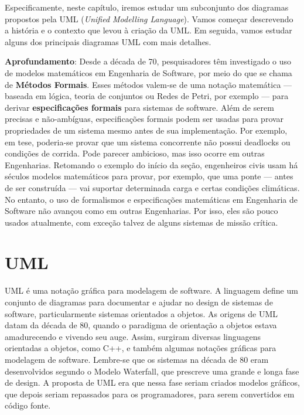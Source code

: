 \documentclass[
  11pt,
  twoside]{book}
\newenvironment{esmbox}{\centering \vspace{1.5ex} \begin{tcolorbox}[breakable, colback=backcolor, width=4.9in]}{\end{tcolorbox} \vspace{1.5ex}}
\begin{document}
Especificamente, neste capítulo, iremos estudar um subconjunto dos
diagramas propostos pela UML (\emph{Unified Modelling Language}). Vamos
começar descrevendo a história e o contexto que levou à criação da UML.
Em seguida, vamos estudar alguns dos principais diagramas UML com mais
detalhes.


\begin{esmbox}

\textbf{Aprofundamento}: Desde a década de 70, pesquisadores têm
investigado o uso de modelos matemáticos em Engenharia de Software, por
meio do que se chama de \textbf{Métodos Formais}. Esses métodos valem-se
de uma notação matemática --- baseada em lógica, teoria de conjuntos ou
Redes de Petri, por exemplo --- para derivar \textbf{especificações
formais} para sistemas de software. Além de serem precisas e
não-ambíguas, especificações formais podem ser usadas para provar
propriedades de um sistema mesmo antes de sua implementação. Por
exemplo, em tese, poderia-se provar que um sistema concorrente não
possui deadlocks ou condições de corrida. Pode parecer ambicioso, mas
isso ocorre em outras Engenharias. Retomando o exemplo do início da
seção, engenheiros civis usam há séculos modelos matemáticos para
provar, por exemplo, que uma ponte --- antes de ser construída --- vai
suportar determinada carga e certas condições climáticas. No entanto, o
uso de formalismos e especificações matemáticas em Engenharia de
Software não avançou como em outras Engenharias. Por isso, eles são
pouco usados atualmente, com exceção talvez de alguns sistemas de missão
crítica.

\end{esmbox}

\hypertarget{uml}{%
\section{UML}\label{uml}}


UML é uma notação gráfica para modelagem de software. A linguagem define
um conjunto de diagramas para documentar e ajudar no design de sistemas
de software, particularmente sistemas orientados a objetos. As origens
de UML datam da década de 80, quando o paradigma de orientação a objetos
estava amadurecendo e vivendo seu auge. Assim, surgiram diversas
linguagens orientadas a objetos, como C++, e também algumas notações
gráficas para modelagem de software. Lembre-se que os sistemas na década
de 80 eram desenvolvidos segundo o Modelo Waterfall, que prescreve uma
grande e longa fase de design. A proposta de UML era que nessa fase
seriam criados modelos gráficos, que depois seriam repassados para os
programadores, para serem convertidos em código fonte.
\end{document}
